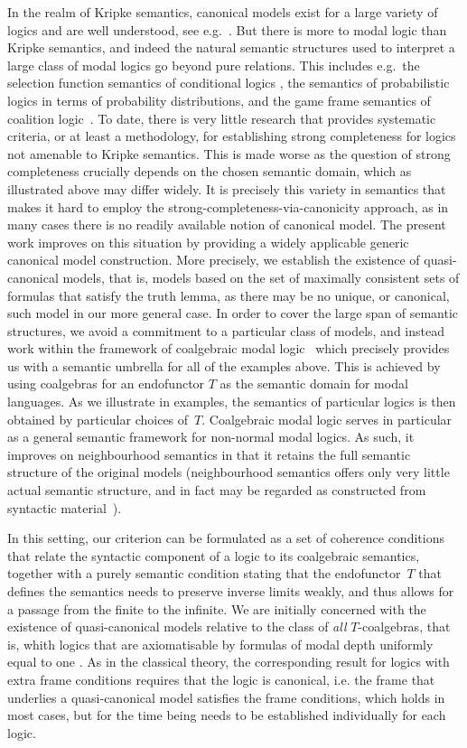\documentclass[proceedings]{stacs}
\theoremstyle{definition}
\theoremstyle{plain}
\begin{document}
In the realm of Kripke semantics, canonical models exist for a large
variety of logics and are well understood, see e.g.\
\cite{BlackburnEA01}. But there is more to modal logic than Kripke
semantics, and indeed the natural semantic structures used to
interpret a  large
class of modal logics go beyond pure relations. This includes e.g.\
the selection function semantics of conditional logics
\cite{Chellas80}, the semantics of probabilistic logics in terms of
probability distributions, and the game frame semantics of coalition 
logic~\cite{Pauly02}.  
To date, there is very little research that provides systematic
criteria, or at least a methodology, for establishing strong
completeness for logics not amenable to Kripke semantics.  This is made worse
as the question of strong completeness crucially depends on the chosen
semantic domain, which as illustrated above may differ widely. It is
precisely this variety in semantics that makes it hard to employ the
strong-completeness-via-canonicity approach, as in many cases there is
no readily available notion of canonical model.  The present work
improves on this situation by providing a widely applicable generic
canonical model construction. More precisely,  we establish the
existence of quasi-canonical models, that is, models based on the
set of maximally consistent sets of formulas that satisfy the truth
lemma, as there may be no unique, or canonical, such model in our
more general case.
In order to cover the large span of semantic structures, we avoid a
commitment to a particular class of models, and instead work within
the framework of coalgebraic modal logic~\cite{Pattinson03} which
precisely provides us with a semantic umbrella for all of the examples
above.  This is achieved by using coalgebras for an endofunctor $T$ as
the semantic domain for modal languages. As we illustrate in examples,
the semantics of particular logics is then obtained by particular
choices of~$T$. Coalgebraic modal logic serves in particular as a
general semantic framework for non-normal modal
logics. As such, it improves on neighbourhood semantics in that it
retains the full semantic structure of the original models
(neighbourhood semantics offers only very little actual semantic
structure, and in fact may be regarded as constructed from syntactic
material~\cite{SchroderPattinson07mcs}).



In this setting, our criterion can be formulated as a set of coherence
conditions that relate the syntactic component of a logic to its
coalgebraic semantics, together with a purely semantic condition
stating that the endofunctor~$T$ that defines the semantics needs to
preserve inverse limits weakly, and thus allows for a passage from the
finite to the infinite. We are initially concerned with the existence
of quasi-canonical models relative to the class of \emph{all}
$T$-coalgebras, that is, whith logics that are axiomatisable by
formulas of modal depth uniformly equal to one \cite{Schroder07}.  As
in the classical theory, the corresponding result for logics with
extra frame conditions requires that the logic is canonical, i.e. the
frame that underlies a quasi-canonical model satisfies the frame
conditions, which holds in most cases, but for the time being needs to
be established individually for each logic.
\end{document}
